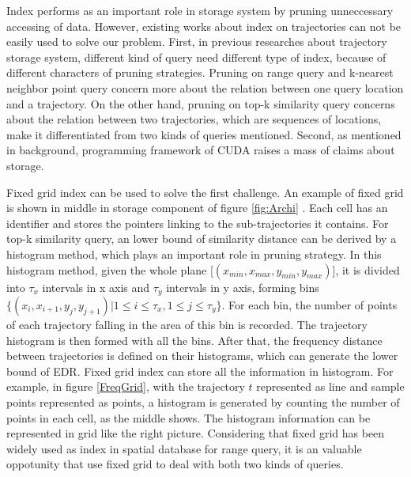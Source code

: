 \documentclass[conference]{IEEEtran}
\begin{document}
Index performs as an important role in storage system by pruning unneccessary accessing of data. However, existing works about index on trajectories can not be easily used to solve our problem. First, in previous researches about trajectory storage system, different kind of query need different type of index, because of different characters of pruning strategies. Pruning on range query and k-nearest neighbor point query concern more about the relation between one query location and a trajectory. On the other hand, pruning on top-k similarity query concerns about the relation between two trajectories, which are sequences of locations, make it differentiated from two kinds of queries mentioned. Second, as mentioned in background, programming framework of CUDA raises a mass of claims about storage.

Fixed grid index can be used to solve the first challenge. An example of fixed grid is shown in middle in storage component of figure \ref{fig:Archi} . Each cell has an identifier and stores the pointers linking to the sub-trajectories it contains. For top-k similarity query, an lower bound of similarity distance can be derived by a histogram method\cite{DBLP:conf/sigmod/ChenOO05}, which plays an important role in pruning strategy. In this histogram method, given the whole plane [$(x_{min},x_{max},y_{min},y_{max})$], it is divided into $\tau_{x}$ intervals in x axis and $\tau_{y}$ intervals in y axis, forming bins $\{(x_{i},x_{i+1},y_{j},y_{j+1})|1 \leq i\leq \tau_{x},1 \leq j\leq \tau_{y}\}$. For each bin, the number of points of each trajectory falling in the area of this bin is recorded. The trajectory histogram is then formed with all the bins. After that, the frequency distance between trajectories is defined on their histograms, which can generate the lower bound of EDR. Fixed grid index can store all the information in histogram. For example, in figure \ref{FreqGrid}, with the trajectory $t$ represented as line and sample points represented as points, a histogram is generated by counting the number of points in each cell, as the middle shows. The histogram information can be represented in grid like the right picture. Considering that fixed grid has been widely used as index in spatial database for range query, it is an valuable oppotunity that use fixed grid to deal with both two kinds of queries. 
\end{document}
